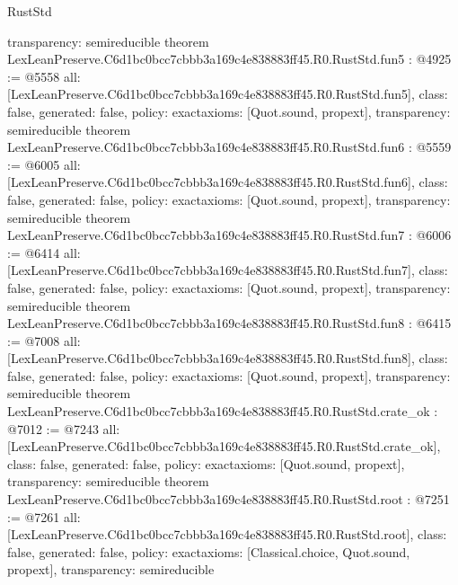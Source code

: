 \begin{lexlean}{RustStd}
\begin{coremodule}
{  transparency: semireducible
}
theorem LexLeanPreserve.C6d1bc0bcc7cbbb3a169c4e838883ff45.R0.RustStd.fun5 : @4925 := @5558 {
  all: [LexLeanPreserve.C6d1bc0bcc7cbbb3a169c4e838883ff45.R0.RustStd.fun5],
  class: false,
  generated: false,
  policy: exact{axioms: [Quot.sound, propext]},
  transparency: semireducible
}
theorem LexLeanPreserve.C6d1bc0bcc7cbbb3a169c4e838883ff45.R0.RustStd.fun6 : @5559 := @6005 {
  all: [LexLeanPreserve.C6d1bc0bcc7cbbb3a169c4e838883ff45.R0.RustStd.fun6],
  class: false,
  generated: false,
  policy: exact{axioms: [Quot.sound, propext]},
  transparency: semireducible
}
theorem LexLeanPreserve.C6d1bc0bcc7cbbb3a169c4e838883ff45.R0.RustStd.fun7 : @6006 := @6414 {
  all: [LexLeanPreserve.C6d1bc0bcc7cbbb3a169c4e838883ff45.R0.RustStd.fun7],
  class: false,
  generated: false,
  policy: exact{axioms: [Quot.sound, propext]},
  transparency: semireducible
}
theorem LexLeanPreserve.C6d1bc0bcc7cbbb3a169c4e838883ff45.R0.RustStd.fun8 : @6415 := @7008 {
  all: [LexLeanPreserve.C6d1bc0bcc7cbbb3a169c4e838883ff45.R0.RustStd.fun8],
  class: false,
  generated: false,
  policy: exact{axioms: [Quot.sound, propext]},
  transparency: semireducible
}
theorem LexLeanPreserve.C6d1bc0bcc7cbbb3a169c4e838883ff45.R0.RustStd.crate_ok : @7012 := @7243 {
  all: [LexLeanPreserve.C6d1bc0bcc7cbbb3a169c4e838883ff45.R0.RustStd.crate_ok],
  class: false,
  generated: false,
  policy: exact{axioms: [Quot.sound, propext]},
  transparency: semireducible
}
theorem LexLeanPreserve.C6d1bc0bcc7cbbb3a169c4e838883ff45.R0.RustStd.root : @7251 := @7261 {
  all: [LexLeanPreserve.C6d1bc0bcc7cbbb3a169c4e838883ff45.R0.RustStd.root],
  class: false,
  generated: false,
  policy: exact{axioms: [Classical.choice, Quot.sound, propext]},
  transparency: semireducible
}


\end{coremodule}
\end{lexlean}
